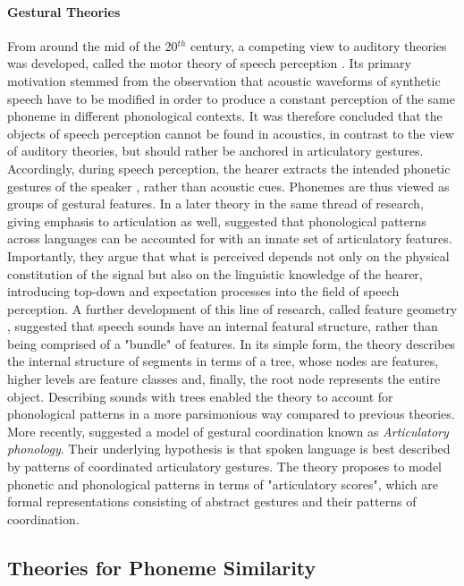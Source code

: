 \paragraph{Gestural Theories}
From around the mid of the 20$^{th}$ century, a competing view to auditory theories was developed, called the motor theory of speech perception \citep{cooper1952some, liberman1967perception}. Its primary motivation stemmed from the observation that acoustic waveforms of synthetic speech have to be modified in order to produce a constant perception of the same phoneme in different phonological contexts. It was therefore concluded that the objects of speech perception cannot be found in acoustics, in contrast to the view of auditory theories, but should rather be anchored in articulatory gestures. Accordingly, during speech perception, the hearer extracts the intended phonetic gestures of the speaker \citep{liberman1985motor}, rather than acoustic cues. Phonemes are thus viewed as groups of gestural features. In a later theory in the same thread of research, giving emphasis to articulation as well, \citet{ChomskyHalle1968} suggested that phonological patterns across languages can be accounted for with an innate set of articulatory features. Importantly, they argue that what is perceived depends not only on the physical constitution of the signal but also on the linguistic knowledge of the hearer, introducing top-down and expectation processes into the field of speech perception. A further development of this line of research, called feature geometry \citep{clements1985, sagey1986representation}, suggested that speech sounds have an internal featural structure, rather than being comprised of a "bundle" of features. In its simple form, the theory describes the internal structure of segments in terms of a tree, whose nodes are features, higher levels are feature classes and, finally, the root node represents the entire object. Describing sounds with trees enabled the theory to account for phonological patterns in a more parsimonious way compared to previous theories. More recently, \citet{browman1990tiers, browman1992articulatory} suggested a model of gestural coordination known as \textit{Articulatory phonology}. Their underlying hypothesis is that spoken language is best described by patterns of coordinated articulatory gestures. The theory proposes to model phonetic and phonological patterns in terms of "articulatory scores", which are formal representations consisting of abstract gestures and their patterns of coordination.


\subsection{Theories for Phoneme Similarity}
